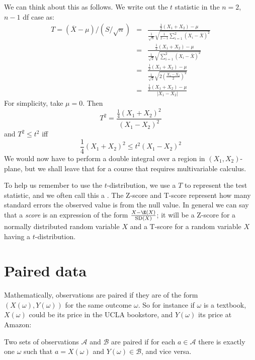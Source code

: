 We can think about this as follows. We write out the $t$ statistic in the $n=2$, $n-1$ df case as:
\begin{eqnarray*}
	T=(\overline X-\mu)/(S/\sqrt{n}) &=& \frac{\frac12(X_1+X_2)-\mu}{\frac1{\sqrt n}\sqrt{ \frac1{2-1}\sum_{i=1}^2 (X_i-\bar X)^2}}\\
	&=&\frac{\frac12(X_1+X_2)-\mu}{\frac1{\sqrt 2}\sqrt{\sum_{i=1}^2 (X_i-\bar X)^2}}\\
	&=&\frac{\frac12(X_1+X_2)-\mu}{\frac1{\sqrt 2}\sqrt{2(\frac{X_1-X_2}2)^2}}\\
	&=& \frac{\frac12(X_1+X_2)-\mu}{|X_1-X_2|}
\end{eqnarray*}
For simplicity, take $\mu=0$. Then
\[
	T^2 = \frac{\frac14(X_1+X_2)^2}{(X_1-X_2)^2}
\]
and $T^2\le t^2$ iff
\[
	\frac14(X_1+X_2)^2\le t^2(X_1-X_2)^2
\]
We would now have to perform a double integral over a region in $(X_1,X_2)$-plane, but we shall leave that for a course that requires multivariable calculus.

\label{oneSampleTTests}


\begin{termBox}{
To help us remember to use the $t$-distribution, we use a $T$ to represent the test statistic, and we often call this a . The Z-score and T-score represent how many standard errors the observed value is from the null value. In general we can say that a \emph{score} is an expression of the form $\frac{X-\E(X)}{\mathrm{SD}(X)}$; it will be a Z-score for a normally distributed random variable $X$ and a T-score for a random variable $X$ having a $t$-distribution.}
\end{termBox}


\section{Paired data}
\label{pairedData}



Mathematically, observations are paired if they are of the form $(X(\omega),Y(\omega))$ for the same outcome $\omega$. So for instance if $\omega$ is a textbook, $X(\omega)$ could be its price in the UCLA bookstore, and $Y(\omega)$ its price at Amazon:
\begin{df}
Two sets of observations $\mathcal A$ and $\mathcal B$ are paired if for each $a\in\mathcal A$ there is exactly one $\omega$ such that $a=X(\omega)$ and $Y(\omega)\in \mathcal B$, and vice versa.
\end{df}

